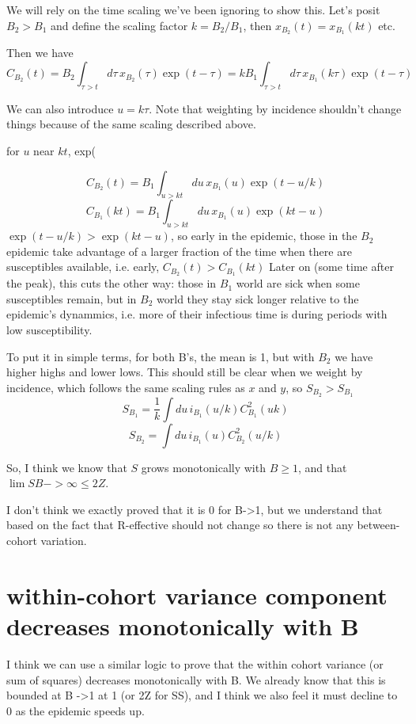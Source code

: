 \documentclass[12pt]{article}
\begin{document}
We will rely on the time scaling we've been ignoring to show this. Let's posit $B_2>B_1$ and define the scaling factor
$k = B_2/B_1$, then
$x_{B_2}(t) = x_{B_1}(kt)$ etc.

Then we have
$$C_{B_2}(t) = B_2 \int_{\tau>t}{d\tau\, x_{B_2}(\tau) \exp(t-\tau)} = kB_1\int_{\tau>t}{d\tau\, x_{B_1}(k\tau) \exp(t-\tau)}$$


We can also introduce $u = k\tau$. Note that weighting by incidence shouldn't change things because of the same scaling described above.



for $u$ near $kt$, exp(


$$C_{B_2}(t) = B_1 \int_{u>kt}{du\,x_{B_1}(u)\exp(t-u/k)}$$
$$C_{B_1}(kt) = B_1 \int_{u>kt}{du\,x_{B_1}(u)\exp(kt-u)}$$
$\exp(t-u/k) > \exp(kt-u)$, so early in the epidemic, those in the $B_2$ epidemic take advantage of a larger fraction of the time when there are susceptibles available, i.e. early, $C_{B_2}(t)>C_{B_1}(kt)$
Later on (some time after the peak), this cuts the other way: those in $B_1$ world are sick when some susceptibles remain, but in $B_2$ world they stay sick longer relative to the epidemic's dynammics, i.e. more of their infectious time is during periods with low susceptibility.

To put it in simple terms, for both B's, the mean is 1, but with $B_2$ we have higher highs and lower lows.
This should still be clear when we weight by incidence, which follows the same scaling rules as $x$ and $y$, so $S_{B_2}>S_{B_1}$
$$S_{B_1} = \frac{1}{k}\int{du\, i_{B_1}(u/k) C^2_{B_1}(uk)}$$
$$S_{B_2}  = \int{du\, i_{B_1}(u) C^2_{B_2}(u/k)} $$

So, I think we know that $S$ grows monotonically with $B \geq 1$, and that $\lim{S} B-> \infty \leq 2Z$.

I don't think we exactly proved that it is 0 for B->1, but we understand that based on the fact that R-effective should not change so there is not any between-cohort variation.

\section{within-cohort variance component decreases monotonically with B}
I think we can use a similar logic to prove that the within cohort variance (or sum of squares) decreases monotonically with B. We already know that this is bounded at B ->1 at 1 (or 2Z for SS), and I think we also feel it must decline to 0 as the epidemic speeds up.
\end{document}
